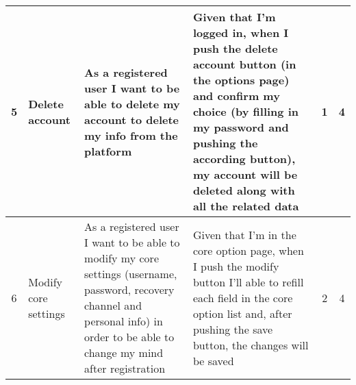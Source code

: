 \begin{tabular}{|c|m{1.5cm}|m{4cm}|m{4cm}|c|c|}
	\hline
	5 & Delete account & 
	As a registered user I want to be able to delete my account to delete my info from the platform & 
	Given that I'm logged in, when I push the delete account button (in the options page) and confirm my choice (by filling in my password and pushing the according button), my account will be deleted along with all the related data &
	1 & 4 \\
	\hline
	6 & Modify core settings & 
	As a registered user I want to be able to modify my core settings (username, password, recovery channel and personal info) in order to be able to change my mind after registration & 
	Given that I'm in the core option page, when I push the modify button I'll able to refill each field in the core option list and, after pushing the save button, the changes will be saved &
	2 & 4 \\
	\hline
\end{tabular}    
\newpage
